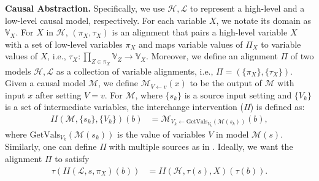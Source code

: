 \textbf{Causal Abstraction.} Specifically, we use $\displaystyle \mathcal{H} ,\mathcal{L}$ to represent a high-level and a low-level causal model, respectively. For each variable $\displaystyle X$, we notate its domain as $\displaystyle \mathbb{V}_{X}$. For   $\displaystyle X$ in $\displaystyle \mathcal{H}$, $\displaystyle ( \pi_X ,\tau _{X})$ is an alignment that pairs a high-level variable $\displaystyle X$ with a set of low-level variables $\displaystyle \pi_X$ and maps variable values of $\Pi_{X}$ to variable values of $X$, i.e.,
$\displaystyle \tau _{X} :\prod _{Z\in \pi_X}\mathbb{V}_{Z}\rightarrow \mathbb{V}_{X}$.
Moreover, we define an alignment $\displaystyle \Pi $ of two models $\displaystyle \mathcal{H} ,\mathcal{L}$ as a collection of variable alignments, i.e., $\displaystyle \Pi =(\{\pi_X\} ,\{\tau _{X}\})$. Given a causal model $\displaystyle \mathcal{M}$, we define $\displaystyle \mathcal{M}_{V\leftarrow v}( x)$ to be the output of $\displaystyle \mathcal{M}$ with input $\displaystyle x$ after setting $\displaystyle V = v$. For $\displaystyle \mathcal{M}$, where $\{s_{k}\}$ is a source input setting and $\{V_k\}$ is a set of intermediate variables, the interchange intervention (\textit{II}) is defined as: 
\begin{align*}
\textit{II}(\mathcal{M} ,\{s_{k}\} ,\{V_{k}\})( b) & =\mathcal{M}_{V_{k}\leftarrow \text{GetVals}_{V_{k}}(\mathcal{M}( s_{k}))}( b) ,
\end{align*}
where $\displaystyle \text{GetVals}_{V_k}(\mathcal{M}( s_k))$ is the value of variables $\displaystyle V$ in model $\displaystyle \mathcal{M}( s)$. Similarly, one can define \textit{II} with multiple sources as in \cite{geiger2023causal,geiger-etal-2023-DAS}. Ideally, we want the alignment $\displaystyle \Pi $ to satisfy 
\begin{align*}
\tau ( \textit{II}(\mathcal{L} ,s,\pi_X)( b)) & =\textit{II}(\mathcal{H} ,\tau ( s) ,X)( \tau ( b)) .
\end{align*}


